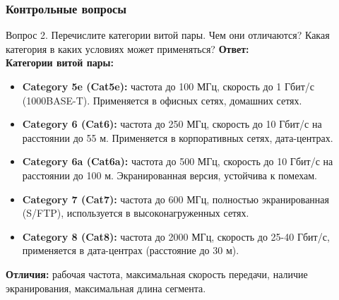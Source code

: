 \begin{frame}
\frametitle{Контрольные вопросы}

\begin{block}{Вопрос 2. Перечислите категории витой пары. Чем они отличаются? Какая категория в каких условиях может применяться?}
\textbf{Ответ:} \\
\textbf{Категории витой пары:}
\begin{itemize}
    \item \textbf{Category 5e (Cat5e):} частота до 100 МГц, скорость до 1 Гбит/с (1000BASE-T). Применяется в офисных сетях, домашних сетях.
    \item \textbf{Category 6 (Cat6):} частота до 250 МГц, скорость до 10 Гбит/с на расстоянии до 55 м. Применяется в корпоративных сетях, дата-центрах.
    \item \textbf{Category 6a (Cat6a):} частота до 500 МГц, скорость до 10 Гбит/с на расстоянии до 100 м. Экранированная версия, устойчива к помехам.
    \item \textbf{Category 7 (Cat7):} частота до 600 МГц, полностью экранированная (S/FTP), используется в высоконагруженных сетях.
    \item \textbf{Category 8 (Cat8):} частота до 2000 МГц, скорость до 25-40 Гбит/с, применяется в дата-центрах (расстояние до 30 м).
\end{itemize}
\textbf{Отличия:} рабочая частота, максимальная скорость передачи, наличие экранирования, максимальная длина сегмента.
\end{block}

\end{frame}

